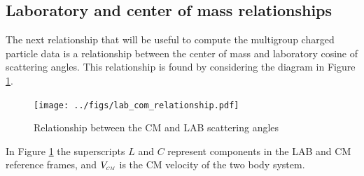 \subsection{Laboratory and center of mass relationships}
The next relationship that will be useful to compute the multigroup charged particle data is a relationship between the center of mass and laboratory cosine of scattering angles. This relationship is found by considering the diagram in Figure \ref{fig:lab_com_rel}.
\begin{figure}[!htb]
  \centering
  \texttt{[image: ../figs/lab\_com\_relationship.pdf]}
  \caption{Relationship between the CM and LAB scattering angles}
  \label{fig:lab_com_rel}
\end{figure}
In Figure \ref{fig:lab_com_rel} the superscripts $L$ and $C$ represent components in the LAB and CM reference frames, and $V_{\scaleto{CM}{3pt}}$ is the CM velocity of the two body system.

